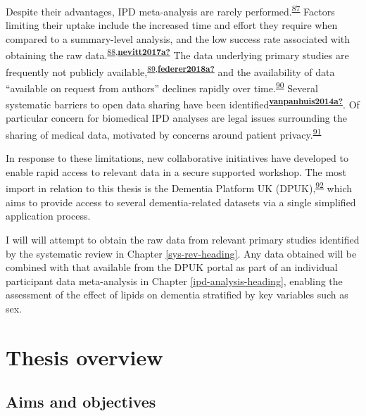 \documentclass[a4paper, twoside]{templates/ociamthesis}
\begin{document}
Despite their advantages, IPD meta-analysis are rarely performed.\textsuperscript{\protect\hyperlink{ref-tugwell2010}{87}} Factors limiting their uptake include the increased time and effort they require when compared to a summary-level analysis, and the low success rate associated with obtaining the raw data.\textsuperscript{\protect\hyperlink{ref-ventresca2020}{88},\protect\hyperlink{ref-nevitt2017a}{\textbf{nevitt2017a?}}} The data underlying primary studies are frequently not publicly available,\textsuperscript{\protect\hyperlink{ref-alsheikh-ali2011}{89},\protect\hyperlink{ref-federer2018a}{\textbf{federer2018a?}}} and the availability of data ``available on request from authors'' declines rapidly over time.\textsuperscript{\protect\hyperlink{ref-vines2014}{90}} Several systematic barriers to open data sharing have been identified\textsuperscript{\protect\hyperlink{ref-vanpanhuis2014a}{\textbf{vanpanhuis2014a?}}}. Of particular concern for biomedical IPD analyses are legal issues surrounding the sharing of medical data, motivated by concerns around patient privacy.\textsuperscript{\protect\hyperlink{ref-wartenberg2010}{91}}

In response to these limitations, new collaborative initiatives have developed to enable rapid access to relevant data in a secure supported workshop. The most import in relation to this thesis is the Dementia Platform UK (DPUK),\textsuperscript{\protect\hyperlink{ref-bauermeister2020}{92}} which aims to provide access to several dementia-related datasets via a single simplified application process.

I will will attempt to obtain the raw data from relevant primary studies identified by the systematic review in Chapter \ref{sys-rev-heading}. Any data obtained will be combined with that available from the DPUK portal as part of an individual participant data meta-analysis in Chapter \ref{ipd-analysis-heading}, enabling the assessment of the effect of lipids on dementia stratified by key variables such as sex.

\hypertarget{thesis-overview}{%
\section{Thesis overview}\label{thesis-overview}}

\hypertarget{aims-and-objectives}{%
\subsection{Aims and objectives}\label{aims-and-objectives}}
\end{document}
